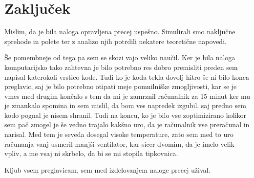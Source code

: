 \documentclass[slovene,11pt,a4paper]{article}
\begin{document}
\section{Zaključek}

Mislim, da je bila naloga opravljena precej uspešno. Simulirali smo naključne sprehode in polete ter z analizo njih potrdili nekatere teoretične napovedi.

Še pomembneje od tega pa sem se skozi vajo veliko naučil. Ker je bila naloga komputacijsko tako zahtevna je bilo potrebno res dobro premisliti preden sem napisal katerokoli vrstico kode. Tudi ko je koda tekla dovolj hitro še ni bilo konca preglavic, saj je bilo potrebno otipati meje pomnilniške zmogljivosti, kar se je vmes med drugim končalo s tem da mi je zamrznil računalnik za 15 minut ker mu je zmankalo spomina in sem mislil, da bom ves napredek izgubil, saj predno sem kodo pognal je nisem shranil. Tudi na koncu, ko je bilo vse zoptimizirano kolikor sem pač zmogel je še vedno trajalo kakšno uro, da je računalnik vse preračunal in narisal. Med tem je seveda dosegal visoke temperature, zato sem med to uro računanja vanj usmeril manjši ventilator, kar sicer dvomim, da je imelo velik vpliv, a me vsaj ni skrbelo, da bi se mi stopila tipkovnica.

Kljub vsem preglavicam, sem med izdelovanjem naloge precej užival.


\bigskip



\end{document}
